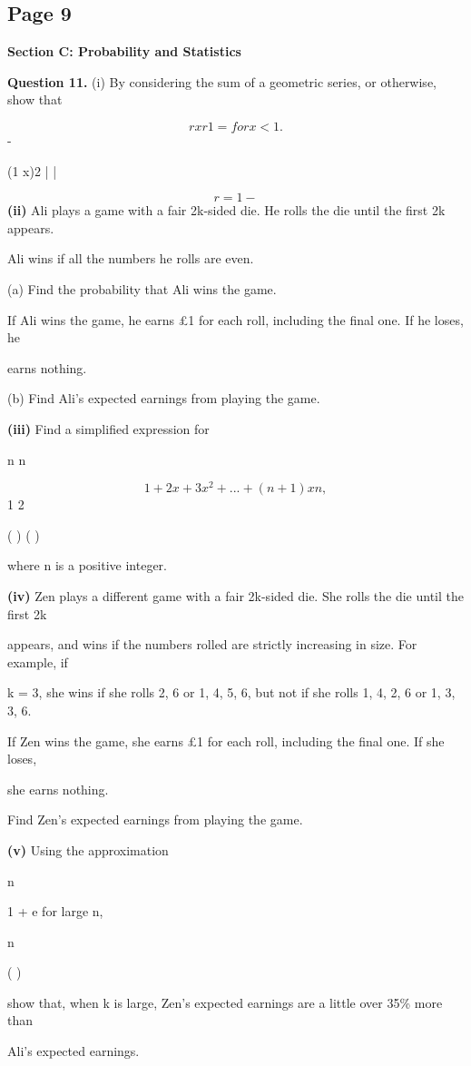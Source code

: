 \documentclass[12pt]{article}
\begin{document}
\subsection*{Page 9}
\begin{flushleft}
\bigskip\textbf{Section C: Probability and Statistics}\par
\bigskip\textbf{Question 11.} (i) By considering the sum of a geometric series, or otherwise, show that\par
{}\par
\[rxr 1 = for x < 1.\]
-\par
(1 x)2 | |\par
\[r=1 -\]
\textbf{(ii)} Ali plays a game with a fair 2k-sided die. He rolls the die until the first 2k appears.\par
Ali wins if all the numbers he rolls are even.\par
(a) Find the probability that Ali wins the game.\par
If Ali wins the game, he earns \pounds 1 for each roll, including the final one. If he loses, he\par
earns nothing.\par
(b) Find Ali's expected earnings from playing the game.\par
\textbf{(iii)} Find a simplified expression for\par
n n\par
\[1 + 2 x + 3 x^2 + . . . + (n + 1)xn,\]
1 2\par
( ) ( )\par
where n is a positive integer.\par
\textbf{(iv)} Zen plays a different game with a fair 2k-sided die. She rolls the die until the first 2k\par
appears, and wins if the numbers rolled are strictly increasing in size. For example, if\par
k = 3, she wins if she rolls 2, 6 or 1, 4, 5, 6, but not if she rolls 1, 4, 2, 6 or 1, 3, 3, 6.\par
If Zen wins the game, she earns \pounds 1 for each roll, including the final one. If she loses,\par
she earns nothing.\par
Find Zen's expected earnings from playing the game.\par
\textbf{(v)} Using the approximation\par
n\par
1 + e for large n,\par
n \approx\par
( )\par
show that, when k is large, Zen's expected earnings are a little over 35\% more than\par
Ali's expected earnings.\par
\end{flushleft}
\end{document}
